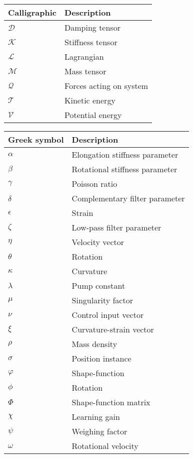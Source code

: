 \begin{spacing}{0.9}
\begin{multicols}{2}
\begin{table}[H]
\centering
    \begin{tabular}{p{2.5cm} p{4cm}} \hline
    \textbf{Calligraphic}    &   \textbf{Description }\\ \hline

    $\mathcal{D}$     &  Damping tensor \\
    $\mathcal{K}$     &  Stiffness tensor \\
    $\mathcal{L}$     &  Lagrangian \\
    $\mathcal{M}$     &  Mass tensor \\
    $\mathcal{Q}$     &  Forces acting on system \\
    $\mathcal{T}$     &  Kinetic energy \\
    $\mathcal{V}$     &  Potential energy \\ \hline
    \end{tabular}
\end{table}



\begin{table}[H]
\centering
    \begin{tabular}{p{2.5cm} p{3.4cm}} \hline
    \textbf{Greek symbol}    &   \textbf{Description }\\ \hline
    $\alpha$      & Elongation stiffness parameter  \\
    $\beta$       & Rotational stiffness parameter \\
    $\gamma$      & Poisson ratio \\
    $\delta$      & Complementary filter parameter \\
    $\epsilon$    & Strain \\
    $\zeta$       & Low-pass filter parameter \\
    $\eta$        & Velocity vector \\
    $\theta$      & Rotation \\
    $\kappa$      & Curvature \\
    $\lambda$     & Pump constant \\
    $\mu$         & Singularity factor \\
    $\nu$         & Control input vector \\
    $\xi$         & Curvature-strain vector \\
    $\rho$        & Mass density \\
    $\sigma$      & Position instance \\
    $\varphi$     & Shape-function \\
    $\phi$        & Rotation  \\
    $\Phi$        & Shape-function matrix \\
    $\chi$         & Learning gain \\
    $\psi$        & Weighing factor \\
    $\omega$      &  Rotational velocity \\ \hline


\end{tabular}
\end{table}
\end{multicols}
\end{spacing}
